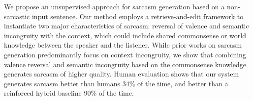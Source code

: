 We propose an unsupervised approach for sarcasm generation based on a non-sarcastic input sentence. Our method employs a retrieve-and-edit framework to instantiate two major characteristics of sarcasm: reversal of valence and semantic incongruity with the context, which could include shared commonsense or world knowledge between the speaker and the listener. While prior works on sarcasm generation predominantly focus on context incongruity, we show that combining valence reversal and semantic incongruity based on the commonsense knowledge generates sarcasm of higher quality. Human evaluation shows that our system generates sarcasm better than humans 34\% of the time, and better than a reinforced hybrid baseline 90\% of the time.
